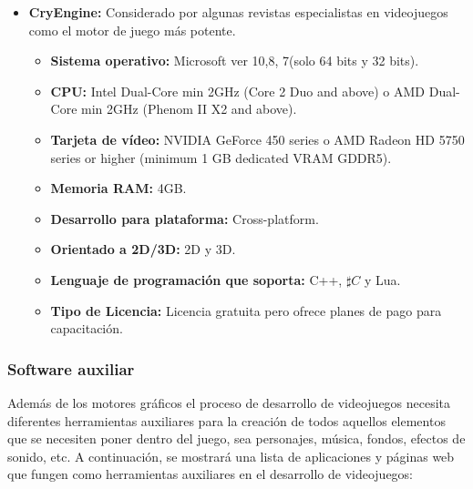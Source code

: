 \begin{itemize}
\begin{itemize}
				(Para Windows), Metal 1.2 Compatible Graphics Card(Para Mac) y NVIDIA 
				GeForce 470 GTX or higher with latest NVIDIA binary drivers(Linux). 
				\item \textbf{Memoria RAM:} 8GB (Microsoft y Mac) y 16GB (Linux).
				\item \textbf{Desarrollo para plataforma:} Cross-platform.
				\item \textbf{Orientado a 2D/3D:} 2D y 3D.
				\item \textbf{Lenguaje de programación que soporta:} C++.
				\item \textbf{Tipo de Licencia:} licencia de pago pero se debe de pagar 
				el 5 por ciento de las regalias cuando el juego sea publicado. 
				\cite{Ref:Unreal}
			\end{itemize}
		\item \textbf{CryEngine:} Considerado por algunas revistas especialistas en 
		videojuegos como el motor de juego más potente. 
			\begin{itemize}
				\item \textbf{Sistema operativo:} Microsoft ver 10,8, 7(solo 64 bits y 
				32 bits).
				\item \textbf{CPU:} Intel Dual-Core min 2GHz (Core 2 Duo and above) o 
				AMD Dual-Core min 2GHz (Phenom II X2 and above).
				\item \textbf{Tarjeta de vídeo:} NVIDIA GeForce 450 series o AMD Radeon 
				HD 5750 series or higher (minimum 1 GB dedicated VRAM GDDR5). 
				\item \textbf{Memoria RAM:} 4GB.
				\item \textbf{Desarrollo para plataforma:} Cross-platform.
				\item \textbf{Orientado a 2D/3D:} 2D y 3D.
				\item \textbf{Lenguaje de programación que soporta:} C++, $\sharp C$ y 
				Lua.
				\item \textbf{Tipo de Licencia:} Licencia gratuita pero ofrece planes de 
				pago para capacitación. \cite{Ref:CryEngine}
			\end{itemize}						
		
	\end{itemize}
	
	\subsubsection{Software auxiliar}
	Además de los motores gráficos el proceso de desarrollo de videojuegos necesita 
	diferentes herramientas auxiliares para la creación de todos aquellos elementos 
	que se necesiten poner dentro del juego, sea personajes, música, fondos, efectos 
	de sonido, etc. A continuación, se mostrará una lista de aplicaciones y páginas 
	web que fungen como herramientas auxiliares en el desarrollo de videojuegos:
	
